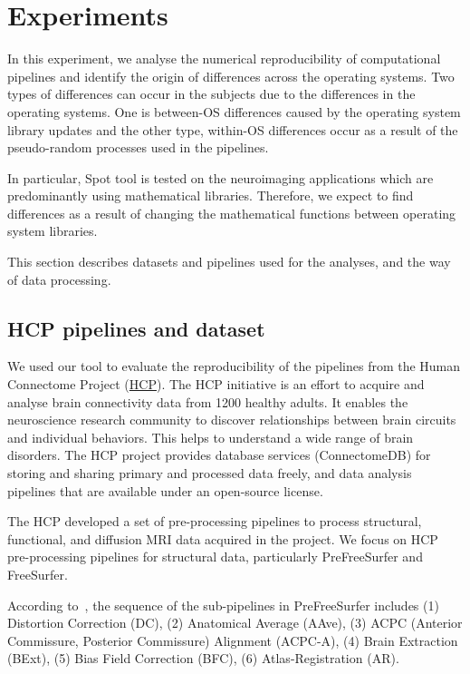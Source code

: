 \documentclass[a4paper,num-refs]{oup-contemporary}
\begin{document}
\section{Experiments}

In this experiment, we analyse the numerical reproducibility of computational pipelines 
and identify the origin of differences across the operating systems. 
Two types of differences can occur in the subjects due to the differences
in the operating systems. One is between-OS differences caused by the
operating system library updates and the other type, within-OS differences
occur as a result of the pseudo-random processes used in the pipelines.

In particular, Spot tool is tested on the neuroimaging applications which are 
predominantly using mathematical libraries. Therefore, we expect to find 
differences as a result of changing the mathematical functions between operating system libraries.

This section describes datasets and pipelines used for the analyses, and the way of data processing.

\subsection{HCP pipelines and dataset}

We used our tool to evaluate the reproducibility of the pipelines from the Human Connectome 
Project (\href{https://www.humanconnectome.org}{HCP}).
The HCP initiative is an effort to acquire and analyse 
brain connectivity data from 1200 healthy adults.
It enables the neuroscience 
research community to discover relationships between brain circuits and 
individual behaviors. This helps to understand a wide range of brain disorders.
The HCP project provides database services (ConnectomeDB) for storing and 
sharing primary and processed data freely, and data analysis pipelines that 
are available under an open-source license.

The HCP developed a set of pre-processing pipelines to process structural,
functional, and diffusion MRI data acquired in the project. We focus on HCP
pre-processing pipelines for structural data, particularly PreFreeSurfer
and FreeSurfer. 

According to~\cite{glasser2013}, the sequence of the 
sub-pipelines in PreFreeSurfer includes 
(1) Distortion Correction (DC), 
(2) Anatomical Average (AAve), 
(3) ACPC (Anterior Commissure, Posterior Commissure) Alignment (ACPC-A), 
(4) Brain Extraction (BExt), 
(5) Bias Field Correction (BFC), 
(6) Atlas-Registration (AR).
\end{document}
